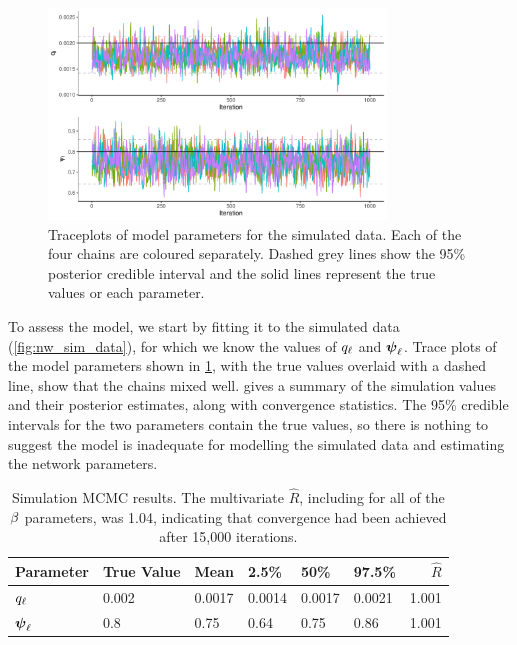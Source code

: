 \begin{knitrout}\small
{}\color{fgcolor}\begin{figure}

{\centering \includegraphics[width=0.8\textwidth]{figure/nw_model_sim_results-1} 

}

\caption[Traceplots of model parameters for the simulated data]{Traceplots of model parameters for the simulated data. Each of the four chains are coloured separately. Dashed grey lines show the 95\% posterior credible interval and the solid lines represent the true values or each parameter.}\label{fig:nw_model_sim_results}
\end{figure}


\end{knitrout}


To assess the model, we start by fitting it to the simulated data (\cref{fig:nw_sim_data}), for which we know the values of $q_\ell$ and $\mathbf{\boldsymbol{\psi}}_\ell$. Trace plots of the model parameters shown in \cref{fig:nw_model_sim_results}, with the true values overlaid with a dashed line, show that the chains mixed well.  gives a summary of the simulation values and their posterior estimates, along with convergence statistics. The 95\% credible intervals for the two parameters contain the true values, so there is nothing to suggest the model is inadequate for modelling the simulated data and estimating the network parameters.


\begin{table}

\caption{\label{tab:nw_model_sim_smry}Simulation MCMC results. The multivariate $\hat R$, including for all of the $\beta$ parameters, was 1.04, indicating that convergence had been achieved after 15,000 iterations.}
\centering
\begin{tabular}[b]{llllllr}
\toprule
Parameter & True Value & Mean & 2.5\% & 50\% & 97.5\% & $\hat R$\\
\midrule
$q_\ell$ & 0.002 & 0.0017 & 0.0014 & 0.0017 & 0.0021 & 1.001\\
$\mathbf{\boldsymbol{\psi}}_\ell$ & 0.8 & 0.75 & 0.64 & 0.75 & 0.86 & 1.001\\
\bottomrule
\end{tabular}
\end{table}





